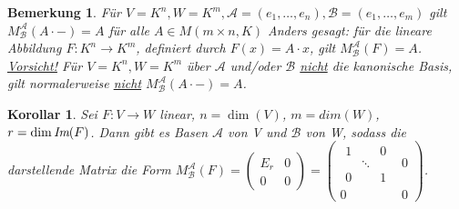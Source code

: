 \documentclass[12pt,a4paper]{article}
\theoremstyle{plain}
\newtheorem{Korollar}[Theorem]{Korollar}
\newtheorem{Bemerkung}[Theorem]{Bemerkung}
\numberwithin{equation}{section}
\begin{document}
\begin{Bemerkung}
Für $V=K^n, W=K^m, \mathcal{A}=(e_1,\ldots,e_n), \mathcal{B}=(e_1,\ldots,e_m)$ gilt $M^\mathcal{A}_\mathcal{B}(A\cdot -)=A$ für alle $A\in M(m\times n, K)$ Anders gesagt: für die lineare Abbildung $F:K^n \rightarrow K^m$, definiert durch $F(x)=A\cdot x$, gilt $M^\mathcal{A}_\mathcal{B}(F)=A$.\\
\underline{Vorsicht!} Für $V=K^n, W=K^m$ über $\mathcal{A}$ und/oder $\mathcal{B}$ \underline{nicht} die kanonische Basis, gilt normalerweise \underline{nicht} $M^\mathcal{A}_\mathcal{B}(A\cdot -)=A$.
\end{Bemerkung}
\begin{Korollar}
Sei $F:V\rightarrow W$ linear, $n=\dim(V)$, $m=dim(W)$, $r=\dim\emph{Im}(F)$. Dann gibt es Basen $\mathcal{A}$ von V und $\mathcal{B}$ von W, sodass die darstellende Matrix die Form $M^\mathcal{A}_\mathcal{B}(F)=\left(\begin{matrix} E_r & 0 \\ 0 & 0 \end{matrix} \right)=\left( \begin{matrix}
\begin{matrix}
1 & & 0\\
& \ddots & \\
0 & & 1 
\end{matrix} & 0 \\ 0 & 0
\end{matrix} \right)$.
\end{Korollar}
\end{document}
